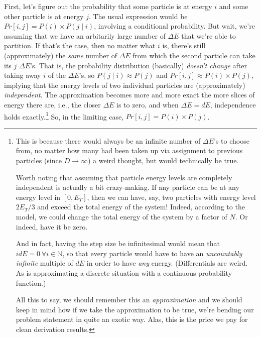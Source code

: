 \documentclass[letterpaper,12pt]{report}
\begin{document}
First, let's figure out the probability that some particle is at energy \(i\) and
some other particle is at energy \(j\). The usual expression would be
\(Pr[i,j] = P(i) \times P(j \mid i)\), involving a conditional probability.
But wait, we're assuming that we have an arbitarily large
number of \(\Delta E\) that we're able to partition. If that's the case, then no matter
what \(i\) is, there's still (approximately) the \emph{same} number of \(\Delta E\) from which
the second particle can take its \(j\) \(\Delta E\)'s. That is, the probability distribution
(basically) \emph{doesn't change} after taking away \(i\) of the \(\Delta E\)'s, so
\(P(j \mid i) \approx P(j)\) and \(Pr[i,j] \approx P(i) \times P(j)\), implying that
the energy levels of two individual particles are (approximately) \emph{independent}. 
The approximation becomes more and more exact the more slices of energy there are, i.e.,
the closer \(\Delta E\) is to zero, 
and when \(\Delta E = dE\), independence holds exactly.\footnote
{
  This is because 
  there would always be an infinite number of \(\Delta E\)'s to choose from, no matter
  how many had been taken up via assignment to previous particles
  (since \(D \rightarrow \infty\))\textemdash{} a weird thought,
  but would technically be true.
  \par
  Worth noting that assuming that particle energy levels are 
  completely independent is actually a bit crazy-making.
  If any particle can be at any energy level in \(\left[0, E_T\right]\), then we can have, say,
  two particles with energy level \(2E_T/3\) and exceed the total energy of the system!
  Indeed, according to the model, we could change the total energy of the system by a factor of
  \(N\). Or indeed, have it be zero.
  \par
  And in fact, having the step size be infinitesimal would mean
  that \(idE = 0 \  \forall i \in \mathbb{N}\), so that every particle would have to have
  an \emph{uncountably infinite} multiple of \(dE\) in order to have \emph{any} energy.
  (Differentials are weird.
  As is approximating a discrete situation with a continuous probability function.)
  \par
  All this to say, we should remember this an \emph{approximation} and we should
  keep in mind how if we take the approximation to be true,
  we're bending our problem statement in quite an exotic way.
  Alas, this is the price we pay for clean derivation results.
}\label{foot:independence-weirdness}
So, in the limiting case, \(Pr[i,j] = P(i) \times P(j)\).
\end{document}
